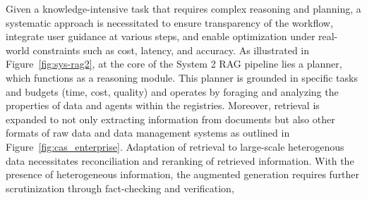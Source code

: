  
Given a knowledge-intensive task that requires complex reasoning and planning, a systematic approach is necessitated to ensure transparency of the workflow, integrate user guidance at various steps, and enable optimization under real-world constraints such as cost, latency, and accuracy. As illustrated in Figure~\ref{fig:sys-rag2}, at the core of the System 2 RAG pipeline lies a planner, which functions as a reasoning module. 
This planner is grounded in specific tasks and budgets (\eg time, cost, quality) and operates by foraging and analyzing the properties of data and agents within the registries. Moreover, retrieval is expanded to not only extracting information from documents but also other formats of raw data and data management systems as outlined in Figure~\ref{fig:cas_enterprise}. Adaptation of retrieval to large-scale heterogenous data necessitates reconciliation and reranking of retrieved information. With the presence of heterogeneous information, the augmented generation requires further scrutinization through fact-checking and verification,
